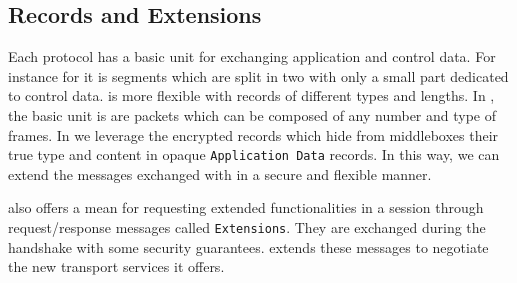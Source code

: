 





\subsection{\tls Records and Extensions}

Each protocol has a basic unit for exchanging application and control data.
For instance for \tcp it is \tcp segments which are split in two with only
a small part dedicated to control data.
\tls is more flexible with \tls records of different types and lengths.
In \quic, the basic unit is are \quic packets which can be composed of any number and type
of \quic frames. In \tcpls we leverage the \tls encrypted records which hide from middleboxes
their true type and content in opaque \texttt{Application Data} records.
In this way, we can extend the messages exchanged with \tls in a secure and
flexible manner.


\tls also offers a mean for requesting extended functionalities in a \tls session through
request/response messages called \tls \texttt{Extensions}. They are exchanged during
the \tls handshake with some security guarantees. 
\tcpls extends these messages to negotiate the new transport services it offers.

